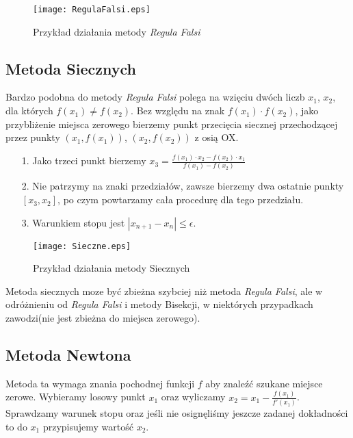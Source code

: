 \documentclass{article}
\begin{document}
  \begin{figure}[!ht]
    \begin{center}
        \texttt{[image: RegulaFalsi.eps]}
        \caption{Przykład działania metody \textit{Regula Falsi}}
    \end{center}
\end{figure}

\newpage

\subsection{Metoda Siecznych}
Bardzo podobna do metody \textit{Regula Falsi} polega na wzięciu dwóch liczb $x_1$, $x_2$, dla których $f(x_1) \neq f(x_2)$. Bez względu na znak $f(x_1) \cdot f(x_2)$, jako przybliżenie miejsca zerowego bierzemy punkt przecięcia siecznej przechodzącej przez punkty $(x_1, f(x_1))$, $(x_2, f(x_2))$ z osią OX.

\begin{enumerate}
  \item[1.] Jako trzeci punkt bierzemy $x_3 = \frac{f(x_1)\cdot x_2-f(x_2)\cdot x_1}{f(x_1)-f(x_2)} $
  \item[2.]Nie patrzymy na znaki przedziałów, zawsze bierzemy dwa ostatnie punkty $[x_3, x_2]$, po czym powtarzamy cała procedurę dla tego przedziału.
  \item[3.]Warunkiem stopu jest $|x_{n+1} - x_{n}| \leq \epsilon $.
\end{enumerate}

\begin{figure}[!ht]
  \begin{center}
      \texttt{[image: Sieczne.eps]}
      \caption{Przykład działania metody Siecznych}
  \end{center}
\end{figure}

Metoda siecznych moze być zbieżna szybciej niż metoda \textit{Regula Falsi}, ale w odróżnieniu od \textit{Regula Falsi} i metody Bisekcji, w niektórych przypadkach zawodzi(nie jest zbieżna do miejsca zerowego).

\subsection{Metoda Newtona}
Metoda ta wymaga znania pochodnej funkcji $f$ aby znaleźć szukane miejsce zerowe. Wybieramy losowy punkt $x_1$ oraz wyliczamy $x_2 = x_1 - \frac{f(x_1)}{f'(x_1)} $. Sprawdzamy warunek stopu oraz jeśli nie osignęliśmy jeszcze zadanej dokładności to do $x_1$ przypisujemy wartość $x_2$.
\end{document}
